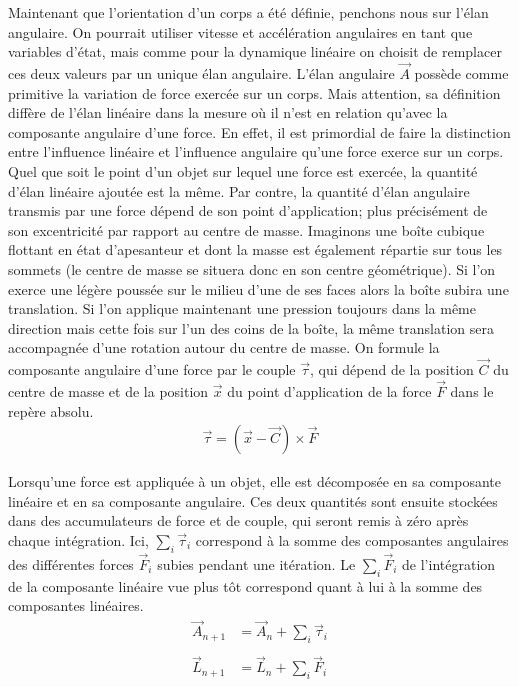 Maintenant que l'orientation d'un corps a été définie, penchons nous
sur l'élan angulaire. On pourrait utiliser vitesse et accélération
angulaires en tant que variables d'état, mais comme pour la dynamique
linéaire on choisit de remplacer ces deux valeurs par un unique élan
angulaire. L'élan angulaire $\vec A$ possède comme primitive la
variation de force exercée sur un corps. Mais attention, sa définition
diffère de l'élan linéaire dans la mesure o\`u il n'est en relation
qu'avec la composante angulaire d'une force. En effet, il est
primordial de faire la distinction entre l'influence linéaire et
l'influence angulaire qu'une force exerce sur un corps. Quel que soit
le point d'un objet sur lequel une force est exercée, la quantité
d'élan linéaire ajoutée est la même. Par contre, la quantité d'élan
angulaire transmis par une force dépend de son point d'application;
plus précisément de son excentricité par rapport au centre de
masse. Imaginons une boîte cubique flottant en état d'apesanteur et
dont la masse est également répartie sur tous les sommets (le centre
de masse se situera donc en son centre géométrique). Si l'on exerce
une légère poussée sur le milieu d'une de ses faces alors la boîte
subira une translation. Si l'on applique maintenant une pression
toujours dans la même direction mais cette fois sur l'un des coins de
la boîte, la même translation sera accompagnée d'une rotation autour
du centre de masse. On formule la composante angulaire d'une force par
le couple $\vec{\tau}$, qui dépend de la position $\vec C$ du centre
de masse et de la position $\vec x$ du point d'application de la force
$\vec{F}$ dans le repère absolu.
\begin{align*}
  \vec{\tau} = (\vec{x} - \vec{C}) \times \vec{F}
\end{align*}

Lorsqu'une force est appliquée à un objet, elle est décomposée en sa
composante linéaire et en sa composante angulaire. Ces deux quantités
sont ensuite stockées dans des accumulateurs de force et de couple,
qui seront remis à zéro après chaque intégration. Ici, $\sum_i
\vec{\tau}_i$ correspond à la somme des composantes angulaires des
différentes forces $\vec{F}_i$ subies pendant une itération. Le $\sum_i
\vec{F}_i$ de l'intégration de la composante linéaire vue plus tôt
correspond quant à lui à la somme des composantes linéaires.
\begin{align*}
  \vec{A}_{n+1} &= \vec{A}_n + {\sum_i \vec{\tau}_i} \\ \\
  \vec{L}_{n+1} &= \vec{L}_n + {\sum_i \vec{F}_i}
\end{align*}

